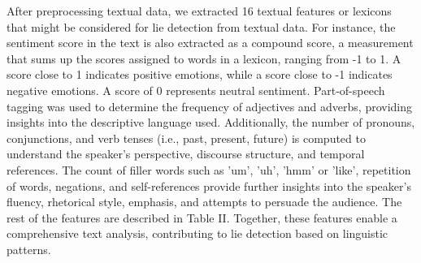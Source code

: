 \documentclass[12pt]{article}
\begin{document}
After preprocessing textual data, we extracted 16 textual features or lexicons that might be considered for lie detection from textual data. For instance, 
the sentiment score in the text is also extracted as a compound score, a measurement that sums up the scores assigned to words in a lexicon, ranging from -1 to 1. A score close to 1 indicates positive emotions, while a score close to -1 indicates negative emotions. A score of 0 represents neutral sentiment. Part-of-speech tagging was used to determine the frequency of adjectives and adverbs, providing insights into the descriptive language used. Additionally, the number of pronouns, conjunctions, and verb tenses (i.e., past, present, future) is computed to understand the speaker's perspective, discourse structure, and temporal references. The count of filler words such as 'um', 'uh', 'hmm' or 'like', repetition of words, negations, and self-references provide further insights into the speaker's fluency, rhetorical style, emphasis, and attempts to persuade the audience. The rest of the features are described in Table II. Together, these features enable a comprehensive text analysis, contributing to lie detection based on linguistic patterns.
\end{document}
